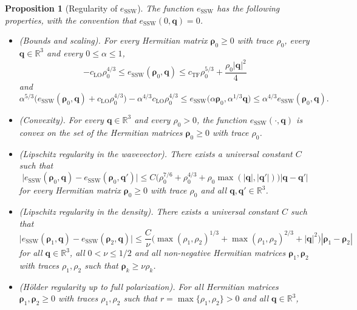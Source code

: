 \documentclass[final,reqno]{amsart}
\newtheorem{proposition}[theorem]{Proposition}
\theoremstyle{remark}
\renewcommand{\le}{\leqslant}
\renewcommand{\ge}{\geqslant}
\newcommand{\RR}{\mathbb{R}}
\newcommand{\TF}{\mathrm{TF}}
\newcommand{\LO}{\mathrm{LO}}
\newcommand{\SSW}{\mathrm{SSW}}
\begin{document}
\begin{proposition}[Regularity of $e_\SSW$]\label{prop:Lipschitz_SSW}
The function $e_\SSW$ has the following properties, with the convention that $e_\SSW(0,\mathbf{q})=0$.
\begin{itemize}
\item[(i)] \emph{(Bounds and scaling)}. For every Hermitian matrix $\bm{\rho}_0\ge0$ with trace $\rho_0$, every $\mathbf{q}\in\RR^3$ and every $0\le\alpha\le1$,
\begin{equation}\label{eq:bounds_SSW}
-c_\LO\rho_0^{4/3}\le e_\SSW(\bm{\rho}_0,\mathbf{q})\le c_\TF\rho_0^{5/3}+\frac{\rho_0|\mathbf{q}|^2}{4}
\end{equation}
and
\begin{equation}\label{eq:scaling_SSW}
\alpha^{5/3}\big(e_\SSW(\bm{\rho}_0,\mathbf{q})+c_\LO\rho_0^{4/3}\big)-\alpha^{4/3}c_\LO\rho_0^{4/3}\le e_\SSW\big(\alpha \bm{\rho}_0,\alpha^{1/3}\mathbf{q}\big)\le \alpha^{4/3}e_\SSW(\bm{\rho}_0,\mathbf{q}).
\end{equation}
\item[(ii)] \emph{(Convexity)}. For every $\mathbf{q}\in\RR^3$ and every $\rho_0>0$, the function $e_\SSW(\cdot,\mathbf{q})$ is convex on the set of the Hermitian matrices $\bm{\rho}_0\ge0$ with trace $\rho_0$.
\item[(iii)] \emph{(Lipschitz regularity in the wavevector)}. There exists a universal constant $C$ such that
\begin{equation}\label{eq:Lipschitz_q}
\big|e_\SSW(\bm{\rho}_0,\mathbf{q})-e_\SSW(\bm{\rho}_0,\mathbf{q}')\big|\le C\Big(\rho_0^{7/6}+\rho_0^{4/3}+\rho_0\max(|\mathbf{q}|,|\mathbf{q}'|)\Big)|\mathbf{q}-\mathbf{q}'|
\end{equation}
for every Hermitian matrix $\bm{\rho}_0\ge0$ with trace $\rho_0$ and all $\mathbf{q},\mathbf{q}'\in\RR^3$.
\item[(iv)] \emph{(Lipschitz regularity in the density)}. There exists a universal constant $C$ such that
\begin{equation}\label{eq:Lipschitz_SSW}
\big|e_\SSW(\bm{\rho}_1,\mathbf{q})-e_\SSW(\bm{\rho}_2,\mathbf{q})\big|\le \frac{C}{\nu}\Big(\max(\rho_1,\rho_2)^{1/3}+\max(\rho_1,\rho_2)^{2/3}+|\mathbf{q}|^2\Big)|\bm{\rho}_1-\bm{\rho}_2|
\end{equation}
for all $\mathbf{q}\in\RR^3$, all $0<\nu\le1/2$ and all non-negative Hermitian matrices $\bm{\rho}_1,\bm{\rho}_2$ with traces $\rho_1,\rho_2$ such that $\bm{\rho}_k\ge\nu\rho_k$.
\item[(v)] \emph{(H\"older regularity up to full polarization)}. For all Hermitian matrices $\bm{\rho}_1,\bm{\rho}_2\ge0$ with traces $\rho_1,\rho_2$ such that $r=\max\{\rho_1,\rho_2\}>0$ and all $\mathbf{q}\in\RR^3$,

\end{itemize}
\end{proposition}
\end{document}
